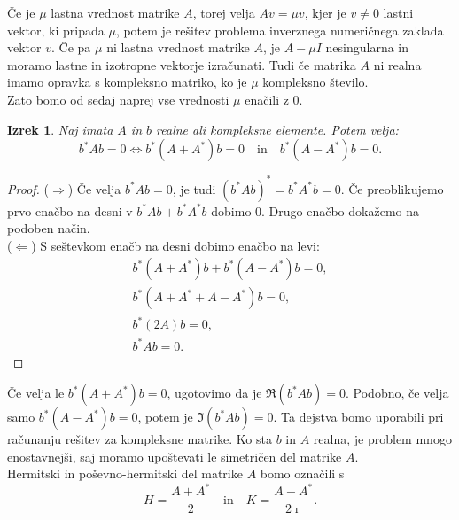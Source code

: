 \documentclass[12pt,a4paper]{amsart}
\theoremstyle{definition}
\theoremstyle{plain}
\newtheorem{izrek}[definicija]{Izrek}
\begin{document}
Če je $\mu$ lastna vrednost matrike $A$, torej velja $Av=\mu v$, kjer je $v\ne 0$ lastni vektor, ki pripada $\mu$, potem je rešitev problema inverznega numeričnega zaklada vektor $v$. 
Če pa $\mu$ ni lastna vrednost matrike $A$, je $A-\mu I$ nesingularna in moramo lastne in izotropne vektorje izračunati. Tudi če matrika $A$ ni realna imamo opravka s kompleksno matriko, ko je $\mu$ kompleksno število.\\
Zato bomo od sedaj naprej vse vrednosti $\mu$ enačili z $0$.
\begin{izrek}\cite{meurant}
Naj imata $A$ in $b$ realne ali kompleksne elemente. Potem velja:
$$b^\ast Ab=0\Leftrightarrow b^\ast (A+A^\ast)b=0\quad \textrm{in} \quad b^\ast(A-A^\ast)b=0.$$
\end{izrek}
\begin{proof}
($\Rightarrow$) Če velja $b^\ast Ab=0$, je tudi $(b^\ast Ab)^\ast=b^\ast A^\ast b=0$. Če preoblikujemo prvo enačbo na desni v $b^\ast Ab +b^\ast A^\ast b$ dobimo 0. Drugo enačbo dokažemo na podoben način.\\
($\Leftarrow$) S seštevkom enačb na desni dobimo enačbo na levi:
\begin{align*}
 b^\ast (A+A^\ast)b+b^\ast(A-A^\ast)b=0,\\
b^\ast (A+A^\ast+A-A^\ast)b=0,\\
b^\ast (2A)b=0,\\
b^\ast Ab=0.
\end{align*}
\end{proof}

Če velja le $b^\ast (A+A^\ast)b=0$, ugotovimo da je $\Re(b^\ast Ab)=0$. Podobno, če velja samo $b^\ast(A-A^\ast)b=0$, potem je $\Im(b^\ast Ab)=0$. Ta dejstva bomo uporabili pri računanju rešitev za kompleksne matrike. 
Ko sta $b$ in $A$ realna, je problem mnogo enostavnejši, saj moramo upoštevati le simetričen del matrike $A$.\\
Hermitski in poševno-hermitski del matrike $A$ bomo označili s $$H=\frac{A+A^\ast}{2}\quad \text{in} \quad K=\frac{A-A^\ast}{2\imath}.$$
\end{document}
